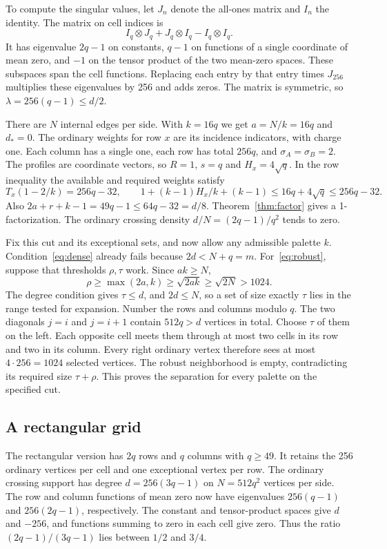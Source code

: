 \documentclass[11pt]{article}
\begin{document}
To compute the singular values, let \(J_n\) denote the all-ones matrix and \(I_n\) the identity. The matrix on cell indices is
\[
 I_q\otimes J_q+J_q\otimes I_q-I_q\otimes I_q .
\]
It has eigenvalue \(2q-1\) on constants, \(q-1\) on functions of a single coordinate of mean zero, and \(-1\) on the tensor product of the two mean-zero spaces. These subspaces span the cell functions. Replacing each entry by that entry times \(J_{256}\) multiplies these eigenvalues by 256 and adds zeros. The matrix is symmetric, so \(\lambda=256(q-1)\le d/2\).

There are \(N\) internal edges per side. With \(k=16q\) we get \(a=N/k=16q\) and \(d_*=0\). The ordinary weights for row \(x\) are its incidence indicators, with charge one. Each column has a single one, each row has total \(256q\), and \(\sigma_A=\sigma_B=2\). The profiles are coordinate vectors, so \(R=1\), \(s=q\) and \(H_x=4\sqrt q\). In the row inequality the available and required weights satisfy
\[
 T_x(1-2/k)=256q-32,\qquad
 1+(k-1)H_x/k+(k-1)\le16q+4\sqrt q\le256q-32 .
\]
Also \(2a+r+k-1=49q-1\le64q-32=d/8\). Theorem~\ref{thm:factor} gives a 1-factorization. The ordinary crossing density \(d/N=(2q-1)/q^2\) tends to zero.

Fix this cut and its exceptional sets, and now allow any admissible palette \(k\). Condition~\eqref{eq:dense} already fails because \(2d<N+q=m\). For~\eqref{eq:robust}, suppose that thresholds \(\rho,\tau\) work. Since \(ak\ge N\),
\[
 \rho\ge\max(2a,k)\ge\sqrt{2ak}\ge\sqrt{2N}>1024 .
\]
The degree condition gives \(\tau\le d\), and \(2d\le N\), so a set of size exactly \(\tau\) lies in the range tested for expansion. Number the rows and columns modulo \(q\). The two diagonals \(j=i\) and \(j=i+1\) contain \(512q>d\) vertices in total. Choose \(\tau\) of them on the left. Each opposite cell meets them through at most two cells in its row and two in its column. Every right ordinary vertex therefore sees at most \(4\cdot256=1024\) selected vertices. The robust neighborhood is empty, contradicting its required size \(\tau+\rho\). This proves the separation for every palette on the specified cut.

\subsection{A rectangular grid}

The rectangular version has \(2q\) rows and \(q\) columns with \(q\ge49\). It retains the 256 ordinary vertices per cell and one exceptional vertex per row. The ordinary crossing support has degree \(d=256(3q-1)\) on \(N=512q^2\) vertices per side. The row and column functions of mean zero now have eigenvalues \(256(q-1)\) and \(256(2q-1)\), respectively. The constant and tensor-product spaces give \(d\) and \(-256\), and functions summing to zero in each cell give zero. Thus the ratio \((2q-1)/(3q-1)\) lies between \(1/2\) and \(3/4\).
\end{document}
